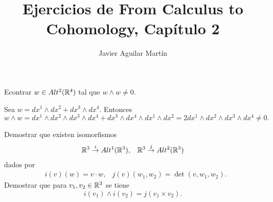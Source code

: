 \documentclass[twoside]{article}
\begin{document}
\title{Ejercicios de From Calculus to Cohomology, Capítulo 2}
\author{Javier Aguilar Martín}
\maketitle


\begin{ejercicio}{2.2}
Econtrar $w\in Alt^2(\mathbb{R}^4)$ tal que $w\land w\neq 0$.
\end{ejercicio}
\begin{solucion}
Sea $w=dx^1\land dx^2 +dx^3\land dx^4$. Entonces
$$w\land w= dx^1\land dx^2\land dx^3\land dx^4 +dx^3\land dx^4\land dx^1\land dx^2=2dx^1\land dx^2\land dx^3\land dx^4 \neq 0.$$
\end{solucion}

\newpage

\begin{ejercicio}{2.3}
Demostrar que existen isomorfismos
\begin{align*}
&\mathbb{R}^3\overset{i}{\to} Alt^1(\mathbb{R}^3), &\mathbb{R}^3\overset{j}{\to} Alt^2(\mathbb{R}^3)
\end{align*}
dados por
\begin{align*}
& i(v)(w)=v\cdot w, & j(v)(w_1,w_2)=\det(v,w_1,w_2).
\end{align*}
Demostrar que para $v_1,v_2\in\mathbb{R}^3$ se tiene
$$i(v_1)\land i(v_2)=j(v_1\times v_2).$$
\end{ejercicio}
\end{document}
